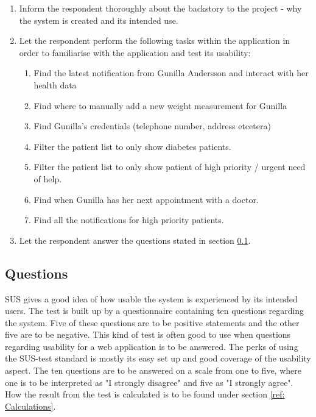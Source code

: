 \documentclass{article}
\begin{document}
	\begin{enumerate}
		\item Inform the respondent thoroughly about the backstory to the project - why the system is created and its intended use. 
		\item Let the respondent perform the following tasks within the application in order to familiarise with the application and test its usability:
		\begin{enumerate}
			\item Find the latest notification from Gunilla Andersson and interact with her health data
			\item Find where to manually add a new weight measurement for Gunilla
			\item Find Gunilla's credentials (telephone number, address etcetera)
			\item Filter the patient list to only show diabetes patients.
			\item Filter the patient list to only show patient of high priority / urgent need of help.
			\item Find when Gunilla has her next appointment with a doctor.
			\item Find all the notifications for high priority patients.
		\end{enumerate}
		\item Let the respondent answer the questions stated in section \ref{Questions}.
	\end{enumerate}
	
	\subsection{Questions} \label{Questions}
	SUS gives a good idea of how usable the system is experienced by its intended users. The test is built up by a questionnaire containing ten questions regarding the system. Five of these questions are to be positive statements and the other five are to be negative. This kind of test is often good to use when questions regarding usability for a web application is to be answered. The perks of using the SUS-test standard is mostly its easy set up and good coverage of the usability aspect. The ten questions are to be answered on a scale from one to five, where one is to be interpreted as "I strongly disagree" and five as "I strongly agree". How the result from the test is calculated is to be found under section \ref{ref: Calculations}. 
	
\end{document}
